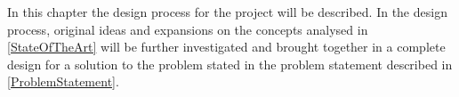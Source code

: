 In this chapter the design process for the project will be described. In the design process, original ideas and expansions on the concepts analysed in \cref{StateOfTheArt} will be further investigated and brought together in a complete design for a solution to the problem stated in the problem statement described in \cref{ProblemStatement}.